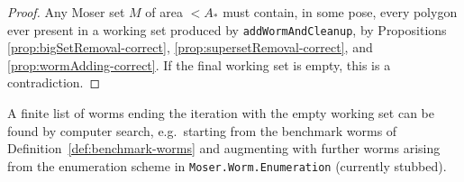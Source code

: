 \begin{proof}
  Any Moser set $M$ of area $<A_*$ must contain, in some pose, every
  polygon ever present in a working set produced by
  \texttt{addWormAndCleanup}, by Propositions
  \ref{prop:bigSetRemoval-correct},
  \ref{prop:supersetRemoval-correct}, and \ref{prop:wormAdding-correct}.
  If the final working set is empty, this is a contradiction.
\end{proof}

\begin{proposition}
  \label{prop:terminating-sequence}
  A finite list of worms ending the iteration with the empty working
  set can be found by computer search, e.g.\ starting from the
  benchmark worms of Definition~\ref{def:benchmark-worms} and augmenting
  with further worms arising from the enumeration scheme in
  \texttt{Moser.Worm.Enumeration} (currently stubbed).
\end{proposition}



